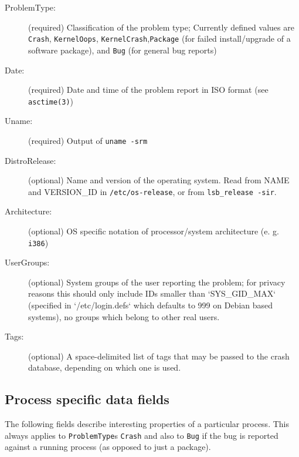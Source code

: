 \documentclass[DIV12,halfparskip]{scrartcl}
\begin{document}
\begin{description}
    \item [ProblemType:] (required) Classification of the problem type;
    Currently defined values are \verb!Crash!, \verb!KernelOops!,
    \verb!KernelCrash!,\verb!Package! (for failed install/upgrade of a software
    package), and \verb!Bug! (for general bug reports)

    \item [Date:] (required) Date and time of the problem report in ISO format
    (see \verb!asctime(3)!)

    \item [Uname:] (required) Output of \verb!uname -srm!

    \item [DistroRelease:] (optional) Name and version of the operating system.
      Read from NAME and VERSION\_ID in \verb!/etc/os-release!, or from
      \verb!lsb_release -sir!.

    \item [Architecture:] (optional) OS specific notation of
    processor/system architecture (e. g. \verb!i386!)

    \item [UserGroups:] (optional) System groups of the user reporting the
    problem; for privacy reasons this should only include IDs smaller than
    `SYS_GID_MAX` (specified in `/etc/login.defs` which defaults to 999 on
    Debian based systems), no groups which belong to other real users.

    \item [Tags:] (optional) A space-delimited list of tags that may be passed
    to the crash database, depending on which one is used.
\end{description}

\subsection{Process specific data fields}

The following fields describe interesting properties of a particular process.
This always applies to \verb!ProblemType!s \verb!Crash! and also to \verb!Bug!
if the bug is reported against a running process (as opposed to just a
package).
\end{document}

